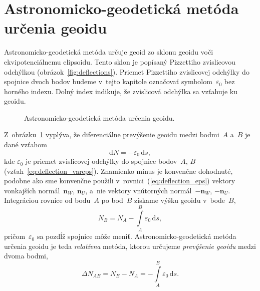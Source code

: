 \documentclass[a4paper, 12pt]{book}
\newcommand{\diff}{\mathrm d}
\let\vec\mathbf
\begin{document}
\section{Astronomicko-geodetická metóda určenia geoidu}
\label{sec:geoid_astrogeodetic}

Astronomicko-geodetická metóda určuje geoid zo sklonu geoidu voči 
ekvipotenciálnemu elipsoidu.  Tento sklon je popísaný Pizzettiho zvislicovou 
odchýlkou (obrázok~\ref{fig:deflections}).  Priemet Pizzettiho zvislicovej 
odchýlky do spojnice dvoch bodov budeme v~tejto kapitole označovať 
symbolom~$\varepsilon_0$ bez horného indexu.  Dolný index indikuje, že 
zvislicová odchýlka sa vzťahuje ku geoidu.

\begin{figure}[bt]
\centering

\caption{Astronomicko-geodetická metóda určenia geoidu.}
\label{fig:astrogeodetic_method}
\end{figure}

Z~obrázku~\ref{fig:astrogeodetic_method} vyplýva, že diferenciálne prevýšenie 
geoidu medzi bodmi~$A$ a~$B$ je dané vzťahom \parencite{MoritzPhysicalGeodesy}
%
\begin{equation}
\label{eq:N_deflections}
\diff N = -\varepsilon_0 \, \diff s{,}
\end{equation}
%
kde $\varepsilon_0$ je priemet zvislicovej odchýlky do spojnice bodov~$A$, $B$ 
(vzťah~\ref{eq:deflection_vareps}).  Znamienko mínus je konvenčne dohodnuté, 
podobne ako sme konvenčne použili v~rovnici~(\ref{eq:deflection_eps}) vektory 
vonkajších normál~$\vec n_W$, $\vec n_U$, a~nie vektory vnútorných 
normál~$-\vec n_W$, $-\vec n_U$.  Integráciou rovnice od bodu~$A$ po bod~$B$ 
získame výšku geoidu v~bode~$B$,
%
\begin{equation}
\label{eq:N_deflections_nb}
N_B = N_A - \int\limits_A^B \varepsilon_0 \, \diff s{,}
\end{equation}
%
pričom~$\varepsilon_0$ sa pozdĺž spojnice môže meniť.  Astronomicko-geodetická 
metóda určenia geoidu je teda \emph{relatívna} metóda, ktorou určujeme 
\emph{prevýšenie geoidu} medzi dvoma bodmi,
%
\begin{equation}
\label{eq:N_deflections_delta}
\Delta N_{AB} = N_B - N_A = - \int\limits_A^B \varepsilon_0 \, \diff s{.}
\end{equation}
\end{document}
